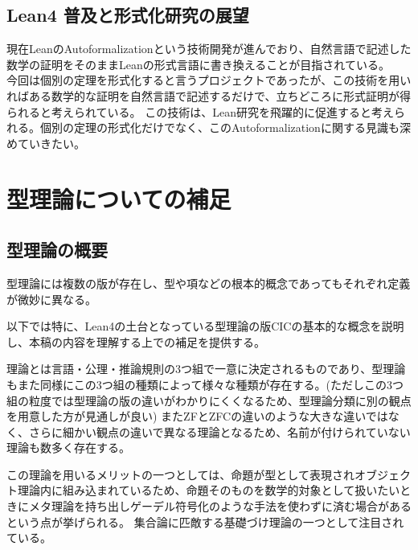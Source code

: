 \documentclass[a4paper,12pt]{bxjsbook}
\newlength{\customindent}
\newenvironment{body}{
  \par
  \begingroup
  \setlength{\leftskip}{\customindent}
  \setlength{\rightskip}{0pt}
  \setlength{\parindent}{1em}
  \setlength{\displayindent}{\customindent}
  \setlength{\displaywidth}{\dimexpr\linewidth-\customindent\relax}
}{
  \par
  \endgroup
}
\theoremstyle{theorem}
\begin{document}
    \section{Lean4 普及と形式化研究の展望}
    \begin{body}
        \indent 現在LeanのAutoformalizationという技術開発が進んでおり、自然言語で記述した数学の証明をそのままLeanの形式言語に書き換えることが目指されている。\\
        今回は個別の定理を形式化すると言うプロジェクトであったが、この技術を用いればある数学的な証明を自然言語で記述するだけで、立ちどころに形式証明が得られると考えられている。
        この技術は、Lean研究を飛躍的に促進すると考えられる。個別の定理の形式化だけでなく、このAutoformalizationに関する見識も深めていきたい。
    \end{body}

    \appendix

    \chapter{型理論についての補足}

    \section{型理論の概要}
    

    \begin{body}
      \indent 型理論には複数の版が存在し、型や項などの根本的概念であってもそれぞれ定義が微妙に異なる。

      \indent 以下では特に、Lean4の土台となっている型理論の版CICの基本的な概念を説明し、本稿の内容を理解する上での補足を提供する。

        \indent 理論とは言語・公理・推論規則の3つ組で一意に決定されるものであり、型理論もまた同様にこの3つ組の種類によって様々な種類が存在する。(ただしこの3つ組の粒度では型理論の版の違いがわかりにくくなるため、型理論分類に別の観点を用意した方が見通しが良い)
        またZFとZFCの違いのような大きな違いではなく、さらに細かい観点の違いで異なる理論となるため、名前が付けられていない理論も数多く存在する。

        \indent この理論を用いるメリットの一つとしては、命題が型として表現されオブジェクト理論内に組み込まれているため、命題そのものを数学的対象として扱いたいときにメタ理論を持ち出しゲーデル符号化のような手法を使わずに済む場合があるという点が挙げられる。
        集合論に匹敵する基礎づけ理論の一つとして注目されている。

    \end{body}
\end{document}
